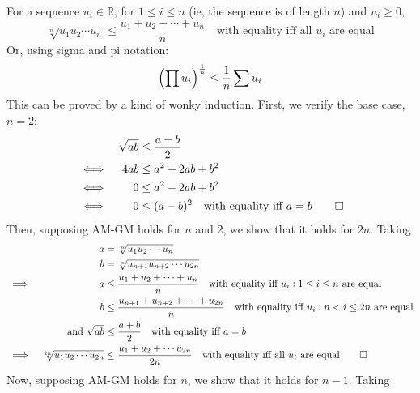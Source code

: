\documentclass[fleqn,a4paper,11pt]{article}
\begin{document}
    For a sequence \(u_i \in \mathbb{R}\), for \(1 \le i \le n\) (ie, the
    sequence is of length \(n\)) and \(u_i \ge 0\),
    \begin{equation*}
    \sqrt[n]{u_1 u_2 \dotsm u_n} \le \frac{u_1 + u_2 + \dotsb + u_n}{n}
        \quad \text{with equality iff all \(u_i\) are equal}
    \end{equation*}
    Or, using sigma and pi notation:
    \begin{equation}
    \pqty{\prod u_i}^\frac{1}{n} \le \frac{1}{n}\sum u_i
    \end{equation}
    This can be proved by a kind of wonky induction. First, we verify the base
    case, \(n = 2\):
    \begin{alignat*}{2}
    &&\sqrt{ab} &\le \frac{a + b}{2} \\
    &\iff& 4ab &\le a^2 + 2ab + b^2 \\
    &\iff& 0 &\le a^2 - 2ab + b^2 \\
    &\iff& 0 &\le (a - b)^2\quad \text{with equality iff \(a = b\)} \qed
    \end{alignat*}
    Then, supposing AM-GM holds for \(n\) and 2, we show that it holds for
    \(2n\).  Taking
    \begin{alignat*}{2}
    &&a &= \sqrt[n]{u_1 u_2 \dotsm u_n} \\
    &&b &= \sqrt[n]{u_{n+1} u_{n+2} \dotsm u_{2n}} \\
    &\implies& a &\le \frac{u_1 + u_2 + \dotsb + u_n}{n}
            \quad \text{with equality iff \(u_i: 1 \le i \le n\) are equal}\\
    &&b &\le \frac{u_{n + 1} + u_{n + 2} + \dotsb + u_{2n}}{n}
            \quad \text{with equality iff \(u_i: n < i \le 2n\) are equal}\\
    &&\text{and}\ \sqrt{ab} &\le \frac{a + b}{2}
        \quad \text{with equality iff \(a = b\)}\\
    &\implies& \sqrt[2n]{u_1 u_2 \dotsm u_{2n}} &\le
             \frac{u_1 + u_2 + \dotsb u_{2n}}{2n}
                \quad \text{with equality iff all \(u_i\) are equal}\qed
    \end{alignat*}
    Now, supposing AM-GM holds for \(n\), we show that it holds for \(n - 1\).
    Taking
\end{document}
